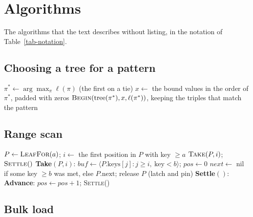 \section{Algorithms}
\label{apx-alg}

The algorithms that the text describes without listing, in the notation of Table~\ref{tab-notation}.

\subsection{Choosing a tree for a pattern}

\begin{algorithm}[h]
\caption{\textsc{ScanFor}$(s,p,o)$: choose a tree for a triple pattern}\label{alg-pattern}
\small
{}
$\pi^* \gets \arg\max_\pi \ell(\pi)$ (the first on a tie)\;
$x \gets$ the bound values in the order of $\pi^*$, padded with zeros\;
\Return $\textsc{Begin}(\mathrm{tree}(\pi^*), x, \ell(\pi^*))$, keeping the triples that match the pattern\;
\end{algorithm}

\subsection{Range scan}

\begin{algorithm}[h]
\caption{\textsc{BeginRange}$(a,b)$, \textsc{Take}, and \textsc{Settle}}\label{alg-range}
\small
$P \gets \textsc{LeafFor}(a)$; $i \gets$ the first position in $P$ with key $\ge a$\;
$\textsc{Take}(P, i)$; $\textsc{Settle}()$\;
\medskip
\textbf{Take}$(P, i)$: $\mathit{buf} \gets \langle P.\text{keys}[j] : j \ge i,\ \text{key} < b\rangle$; $\mathit{pos} \gets 0$\;
\quad $\mathit{next} \gets$ nil if some key $\ge b$ was met, else $P.\text{next}$; release $P$ (latch and pin)\;
\textbf{Settle}$()$: 
\medskip
\textbf{Advance}: $\mathit{pos} \gets \mathit{pos}+1$; \textsc{Settle}()\;
\end{algorithm}

\subsection{Bulk load}

